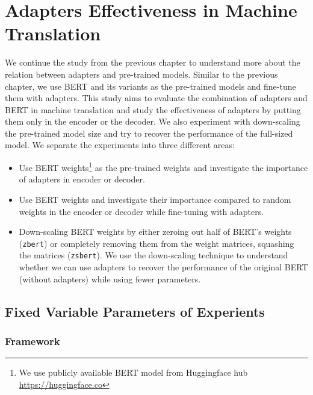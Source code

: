 
\chapter{Adapters Effectiveness in Machine Translation}
\label{chap:adaptefct}
We continue the study from the previous chapter to understand more about the relation between adapters and pre-trained models. Similar to the previous chapter, we use BERT and its variants as the pre-trained models and fine-tune them with adapters. This study aims to evaluate the combination of adapters and BERT in machine translation and study the effectiveness of adapters by putting them only in the encoder or the decoder. We also experiment with down-scaling the pre-trained model size and try to recover the performance of the full-sized model. We separate the experiments into three different areas:
\begin{itemize}
    \item Use BERT weights\footnote{We use publicly available BERT model from Huggingface hub \url{https://huggingface.co}} as the pre-trained weights and investigate the importance of adapters in encoder or decoder.
    \item Use BERT weights and investigate their importance compared to random weights in the encoder or decoder while fine-tuning with adapters.
    \item Down-scaling BERT weights by either zeroing out half of BERT's weights (\texttt{zbert}) or completely removing them from the weight matrices, squashing the matrices (\texttt{zsbert}). We use the down-scaling technique to understand whether we can use adapters to recover the performance of the original BERT (without adapters) while using fewer parameters.
\end{itemize}

\section{Fixed Variable Parameters of Experients}
\subsection{Framework}

